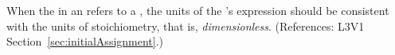 When the  in an \InitialAssignment refers to a \SpeciesReference,
the units of the \InitialAssignment's  expression should be
consistent with the units of stoichiometry,
that is, \emph{dimensionless}.  (References: 
L3V1 Section~\ref{sec:initialAssignment}.)
